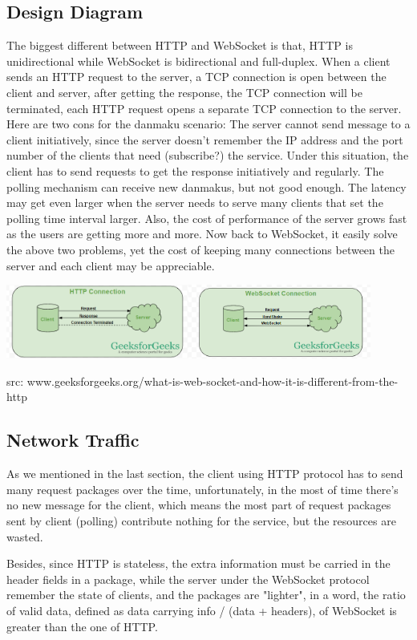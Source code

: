 \documentclass[onecolumn, oneside, ctexart]{SUSTechHomework}
\begin{document}
\subsection{Design Diagram}
The biggest different between HTTP and WebSocket is that, HTTP is unidirectional while WebSocket is bidirectional and full-duplex.
When a client sends an HTTP request to the server, a TCP connection is open between the client and server, after getting the response, the TCP connection will be terminated, each HTTP request opens a separate TCP connection to the server. Here are two cons for the danmaku scenario:  The server cannot send message to a client initiatively, since the server doesn't remember the IP address and the port number of the clients that need (subscribe?) the service. Under this situation, the client has to send requests to get the response initiatively and regularly.  The polling mechanism can receive new danmakus, but not good enough. The latency may get even larger when the server needs to serve many clients that set the polling time interval larger. Also, the cost of performance of the server grows fast as the users are getting more and more. Now back to WebSocket, it easily solve the above two problems, yet the cost of keeping many connections between the server and each client may be appreciable.\\

\centerline{\includegraphics[width=0.45\textwidth]{res/httpi}\quad\includegraphics[width=0.45\textwidth]{res/wsi}}

\centerline{\scriptsize{src: www.geeksforgeeks.org/what-is-web-socket-and-how-it-is-different-from-the-http}}

\subsection{Network Traffic}
As we mentioned in the last section, the client using HTTP protocol has to send many request packages over the time, unfortunately, in the most of time there's no new message for the client, which means the most part of request packages sent by client (polling) contribute nothing for the service, but the resources are wasted.
\par Besides, since HTTP is stateless, the extra information must be carried in the header fields in a package, while the server under the WebSocket protocol remember the state of clients, and the packages are "lighter", in a word, the ratio of valid data, defined as data carrying info / (data + headers), of WebSocket is greater than the one of HTTP.
\end{document}
